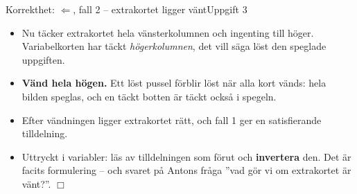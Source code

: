 \documentclass[aspectratio=169,10pt]{beamer}
\newcommand{\hkort}[7][]{%
  \begin{scope}[shift={(#2,#3)},#1]
    \foreach \b [count=\j] in {#4} {\xdef\kortm{\j}}%
    \pgfmathsetmacro{\kH}{0.62+\kortm*0.36+0.34}%
    \path[#7] (0,0) -- (0.52,0) -- (0.52,0.13) -- (0.78,0.13) -- (0.78,0) -- (1.3,0)
      -- (1.3,\kH-0.50) -- (1.17,\kH-0.50) -- (1.17,\kH-0.32) -- (1.3,\kH-0.32) -- (1.3,\kH)
      -- (0,\kH) -- (0,\kH-0.32) -- (0.13,\kH-0.32) -- (0.13,\kH-0.50) -- (0,\kH-0.50) -- cycle;
    \node[font=\scriptsize,inner sep=0pt] at (0.65,\kH-0.25) {#6};
    \foreach \b [count=\j] in {#4} {
      \ifnum\b=1 \path[fill=#7m] (0.38,\kH-0.44-\j*0.36) circle (0.105);
      \else \path[korthal] (0.38,\kH-0.44-\j*0.36) circle (0.105); \fi}
    \foreach \b [count=\j] in {#5} {
      \ifnum\b=1 \path[fill=#7m] (0.92,\kH-0.44-\j*0.36) circle (0.105);
      \else \path[korthal] (0.92,\kH-0.44-\j*0.36) circle (0.105); \fi}
  \end{scope}}
\newcommand{\spegel}[1]{\scalebox{-1}[1]{#1}}
\begin{document}
\begin{frame}{Korrekthet: $\Leftarrow$, fall 2 -- extrakortet ligger vänt}{Uppgift 3}
  \centering
  \vspace{1mm}
  \begin{itemize}
    \item<2-> Nu täcker extrakortet hela vänsterkolumnen och ingenting till höger. Variabelkorten har täckt \emph{högerkolumnen}, det vill säga löst den speglade uppgiften.
    \item<3-> \textbf{Vänd hela högen.} Ett löst pussel förblir löst när alla kort vänds: hela bilden speglas, och en täckt botten är täckt också i spegeln.
    \item<4-> Efter vändningen ligger extrakortet rätt, och fall 1 ger en satisfierande tilldelning.
    \item<5-> Uttryckt i variabler: läs av tilldelningen som förut och \textbf{invertera} den. Det är facits formulering -- och svaret på Antons fråga ''vad gör vi om extrakortet är vänt?''. \hfill$\Box$
  \end{itemize}
\end{frame}
\end{document}
